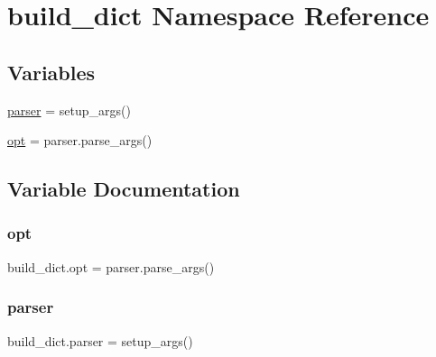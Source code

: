 \hypertarget{namespacebuild__dict}{}\section{build\+\_\+dict Namespace Reference}
\label{namespacebuild__dict}
\subsection*{Variables}
\begin{DoxyCompactItemize}
\item 
\hyperlink{namespacebuild__dict_a5f94323cf271c63a1edd5019b4c9822a}{parser} = setup\+\_\+args()
\item 
\hyperlink{namespacebuild__dict_a32b0ccaefff33eb8d69548e17882318f}{opt} = parser.\+parse\+\_\+args()
\end{DoxyCompactItemize}


\subsection{Variable Documentation}
\mbox{\label{namespacebuild__dict_a32b0ccaefff33eb8d69548e17882318f}} 
\subsubsection{\texorpdfstring{opt}{opt}}
{\footnotesize\ttfamily build\+\_\+dict.\+opt = parser.\+parse\+\_\+args()}

\mbox{\label{namespacebuild__dict_a5f94323cf271c63a1edd5019b4c9822a}} 
\subsubsection{\texorpdfstring{parser}{parser}}
{\footnotesize\ttfamily build\+\_\+dict.\+parser = setup\+\_\+args()}

